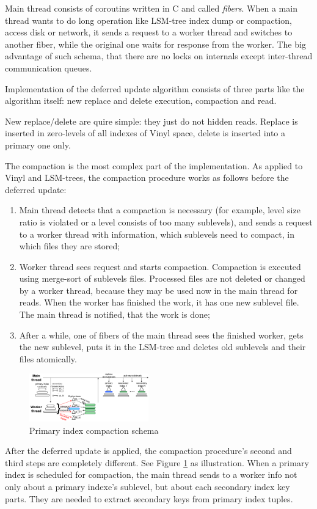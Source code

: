 \documentclass{vldb}
\begin{document}
Main thread consists of coroutins written in C and called \textit{fibers}. When
a main thread wants to do long operation like LSM-tree index dump or compaction,
access disk or network, it sends a request to a worker thread and switches to
another fiber, while the original one waits for response from the worker. The
big advantage of such schema, that there are no locks on internals except
inter-thread communication queues.

Implementation of the deferred update algorithm consists of three parts like the
algorithm itself: new replace and delete execution, compaction and read.

New replace/delete are quire simple: they just do not hidden reads. Replace is
inserted in zero-levels of all indexes of Vinyl space, delete is inserted into a
primary one only.

The compaction is the most complex part of the implementation. As applied to
Vinyl and LSM-trees, the compaction procedure works as follows before the
deferred update:
\begin{enumerate}
\item Main thread detects that a compaction is necessary (for example, level
size ratio is violated or a level consists of too many sublevels), and sends a
request to a worker thread with information, which sublevels need to compact, in
which files they are stored;
\item Worker thread sees request and starts compaction. Compaction is executed
using merge-sort of sublevels files. Processed files are not deleted or changed
by a worker thread, because they may be used now in the main thread for reads.
When the worker has finished the work, it has one new sublevel file. The main
thread is notified, that the work is done;
\item After a while, one of fibers of the main thread sees the finished worker,
gets the new sublevel, puts it in the LSM-tree and deletes old sublevels and
their files atomically.
\end{enumerate}

\begin{figure}
\centering
\includegraphics[width=0.46\textwidth]{compaction_implementation}
\caption{Primary index compaction schema}
\label{fig:compaction_implementation}
\end{figure}
After the deferred update is applied, the compaction procedure's second and
third steps are completely different. See Figure
\ref{fig:compaction_implementation} as illustration. When a primary index is
scheduled for compaction, the main thread sends to a worker info not only about
a primary indexe's sublevel, but about each secondary index key parts. They are
needed to extract secondary keys from primary index tuples.
\end{document}
